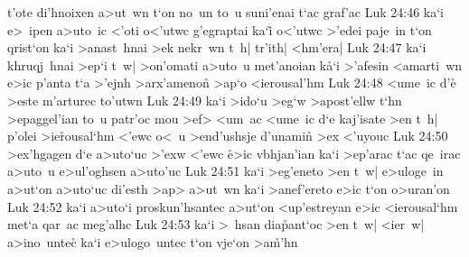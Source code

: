 t'ote
di'hnoixen
a>ut~wn
t`on
no~un
to~u
suni'enai
t`ac
graf'ac\bibvsend
\vs Luk 24:46
ka`i
e>~ipen
a>uto~ic
<'oti
o<'utwc
g'egraptai
ka`i\r{}
o<'utwc
>'edei
paje~in
t`on
qrist`on
ka`i
>anast~hnai
>ek
nekr~wn
t~h|
tr'ith|
<hm'era|\bibvsend
\vs Luk 24:47
ka`i
khruqj~hnai
>ep`i
t~w|
>on'omati
a>uto~u
met'anoian
k\r{a}`i
>'afesin
<amarti~wn
e>ic
p'anta
t`a
>'ejnh
>arx'ameno\r{n}
>ap`o
<ierousal'hm\bibvsend
\vs Luk 24:48
<ume~ic
d'e\r{}
>este
m'arturec
to'utwn\bibvsend
\vs Luk 24:49
ka`i
>ido`u
>eg`w
>apost'ellw
t`hn
>epaggel'ian
to~u
patr'oc
mou
>ef>
<um~ac
<ume~ic
d`e
kaj'isate
>en
t~h|
p'olei
>ie\r{r}ousal`hm
<'ewc
o<~u
>end'ushsje
d'unamin\r{}
>ex
<'uyouc\bibvsend
\vs Luk 24:50
>ex'hgagen
d`e
a>uto`uc
>'exw
<'ewc
\r{e}>ic
vbhjan'ian
ka`i
>ep'arac
t`ac
qe~irac
a>uto~u
e>ul'oghsen
a>uto'uc\bibvsend
\vs Luk 24:51
ka`i
>eg'eneto
>en
t~w|
e>uloge~in
a>ut`on
a>uto`uc
di'esth
>ap>
a>ut~wn
ka`i
>anef'ereto
e>ic
t`on
o>uran'on\bibvsend
\vs Luk 24:52
ka`i
a>uto`i
proskun'hsantec
a>ut`on
<up'estreyan
e>ic
<ierousal`hm
met`a
qar~ac
meg'alhc\bibvsend
\vs Luk 24:53
ka`i
>~hsan
dia\r{p}ant`oc
>en
t~w|
<ier~w|
a>ino~untec\r{}
ka`i
e>ulogo~untec
t`on
vje`on
>a\r{m}'hn\bibvsend
{}
